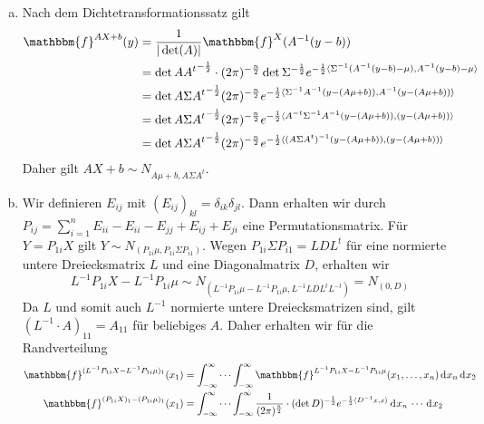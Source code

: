 \documentclass[uebung]{lecture}
\begin{document}
\begin{aufgabe}
    \begin{enumerate}[(a)]
        \item Nach dem Dichtetransformationssatz gilt 
        \begin{align*}
            \mathbbm{f}^{AX + b}(y) &= \frac{1}{|\det(A)|} \mathbbm{f}^{X}(A^{-1}(y-b))\\
            &= \det{AA^t}^{-\frac{1}{2}} \cdot (2\pi)^{-\frac{n}{2}} \det{\Sigma}^{-\frac{1}{2}} e^{-\frac{1}{2}\langle \Sigma^{-1}(A^{-1}(y-b)- \mu), A^{-1}(y-b) - \mu \rangle}\\
            &= \det{A\Sigma A^t}^{-\frac{1}{2}} (2\pi)^{-\frac{n}{2}} e^{-\frac{1}{2}\langle\Sigma^{-1}A^{-1}(y - (A\mu + b)), A^{-1}(y - (A\mu + b))\rangle}\\
            &= \det{A\Sigma A^t}^{-\frac{1}{2}} (2\pi)^{-\frac{n}{2}} e^{-\frac{1}{2}\langle A^{-t}\Sigma^{-1}A^{-1}(y - (A\mu + b)), (y - (A\mu + b))\rangle}\\
            &= \det{A\Sigma A^t}^{-\frac{1}{2}} (2\pi)^{-\frac{n}{2}} e^{-\frac{1}{2}\langle (A\Sigma A^t)^{-1}(y - (A\mu + b)), (y - (A\mu + b))\rangle}
        \end{align*}
        Daher gilt $AX + b \sim N_{A\mu + b, A\Sigma A^t}$. 
        \item Wir definieren $E_{ij}$ mit $(E_{ij})_{kl} = \delta_{ik}\delta_{jl}$.
        Dann erhalten wir durch $P_{ij} = \sum_{i = 1}^{n} E_{ii} - E_{ii} - E_{jj} + E_{ij} + E_{ji}$ eine Permutationsmatrix. 
        Für $Y = P_{1i}X$ gilt $Y \sim N_{(P_{1i}\mu, P_{1i}\Sigma P_{i1})}$.
        Wegen $P_{1i}\Sigma P_{i1} = LDL^t$ für eine normierte untere Dreiecksmatrix $L$ und eine Diagonalmatrix $D$, erhalten wir
        \[
            L^{-1}P_{1i}X - L^{-1}P_{1i}\mu \sim N_{(L^{-1} P_{1i}\mu - L^{-1}P_{1i}\mu, L^{-1}L D L^t L^{-t})} = N_{(0, D)}
        \]
        Da $L$ und somit auch $L^{-1}$ normierte untere Dreiecksmatrizen sind, gilt $(L^{-1}\cdot A)_{11} = A_{11}$ für beliebiges $A$. Daher erhalten wir für die Randverteilung
        \begin{align*}
            \mathbbm{f}^{(L^{-1}P_{1i}X - L^{-1}P_{1i}\mu)_1}(x_1) &= \int_{-\infty}^\infty \cdots \int_{-\infty}^\infty \mathbbm{f}^{L^{-1}P_{1i}X - L^{-1}P_{1i}\mu}(x_1, \dots, x_n) \d{x_n} \d{x_2}\\
            \mathbbm{f}^{(P_{1i}X)_1 - (P_{1i}\mu)_1}(x_1)&= \int_{-\infty}^\infty \cdots \int_{-\infty}^\infty \frac{1}{(2\pi)^{\frac{n}{2}}} \cdot (\det D)^{-\frac{1}{2}} e^{-\frac{1}{2}\langle D^{-1}x, x\rangle} \d{x_n} \cdots \d{x_2}\\

\end{align*}
\end{enumerate}
\end{aufgabe}
\end{document}
